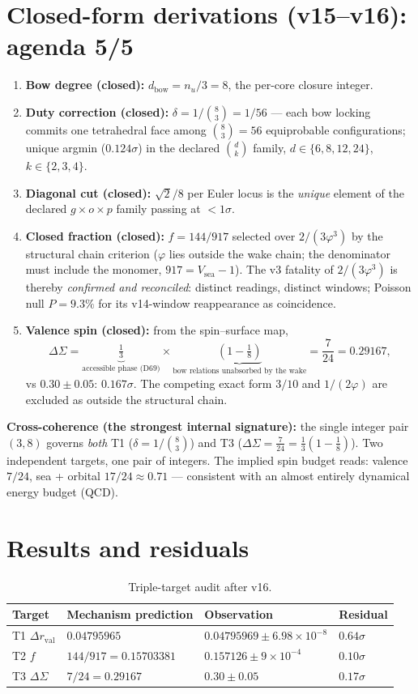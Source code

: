 \documentclass[11pt,a4paper]{article}
\newcommand{\Dr}{\Delta r_{\mathrm{val}}}
\newcommand{\Vsea}{V_{\mathrm{sea}}}
\begin{document}
\section{Closed-form derivations (v15--v16): agenda 5/5}
\begin{enumerate}[leftmargin=1.8em]
\item \textbf{Bow degree (closed):} $d_{\mathrm{bow}} = n_u/3 = 8$, the per-core closure integer.
\item \textbf{Duty correction (closed):} $\delta = 1/\binom{8}{3} = 1/56$ --- each bow locking commits one tetrahedral face among $\binom{8}{3}=56$ equiprobable configurations; unique argmin ($0.124\sigma$) in the declared $\binom{d}{k}$ family, $d\in\{6,8,12,24\}$, $k\in\{2,3,4\}$.
\item \textbf{Diagonal cut (closed):} $\sqrt{2}/8$ per Euler locus is the \emph{unique} element of the declared $g\times o\times p$ family passing at $<1\sigma$.
\item \textbf{Closed fraction (closed):} $f = 144/917$ selected over $2/(3\varphi^{3})$ by the structural chain criterion ($\varphi$ lies outside the wake chain; the denominator must include the monomer, $917 = \Vsea-1$). The v3 fatality of $2/(3\varphi^{3})$ is thereby \emph{confirmed and reconciled}: distinct readings, distinct windows; Poisson null $P = 9.3\%$ for its v14-window reappearance as coincidence.
\item \textbf{Valence spin (closed):} from the spin--surface map,
\[
\Delta\Sigma = \underbrace{\tfrac{1}{3}}_{\text{accessible phase (D69)}} \times \underbrace{\left(1 - \tfrac{1}{8}\right)}_{\text{bow relations unabsorbed by the wake}} = \frac{7}{24} = 0.29167,
\]
vs $0.30 \pm 0.05$: $0.167\sigma$. The competing exact form $3/10$ and $1/(2\varphi)$ are excluded as outside the structural chain.
\end{enumerate}
\textbf{Cross-coherence (the strongest internal signature):} the single integer pair $(3,8)$ governs \emph{both} T1 ($\delta = 1/\binom{8}{3}$) and T3 ($\Delta\Sigma = \tfrac{7}{24} = \tfrac13(1-\tfrac18)$). Two independent targets, one pair of integers. The implied spin budget reads: valence $7/24$, sea + orbital $17/24 \approx 0.71$ --- consistent with an almost entirely dynamical energy budget (QCD).

\section{Results and residuals}
\begin{table}[h]
\centering\small
\begin{tabular}{llll}
\toprule
Target & Mechanism prediction & Observation & Residual \\
\midrule
T1 $\Dr$ & $0.04795965$ & $0.04795969 \pm 6.98\times10^{-8}$ & $0.64\sigma$ \\
T2 $f$ & $144/917 = 0.15703381$ & $0.157126 \pm 9\times10^{-4}$ & $0.10\sigma$ \\
T3 $\Delta\Sigma$ & $7/24 = 0.29167$ & $0.30 \pm 0.05$ & $0.17\sigma$ \\
\bottomrule
\end{tabular}
\caption{Triple-target audit after v16.}
\end{table}
\end{document}
